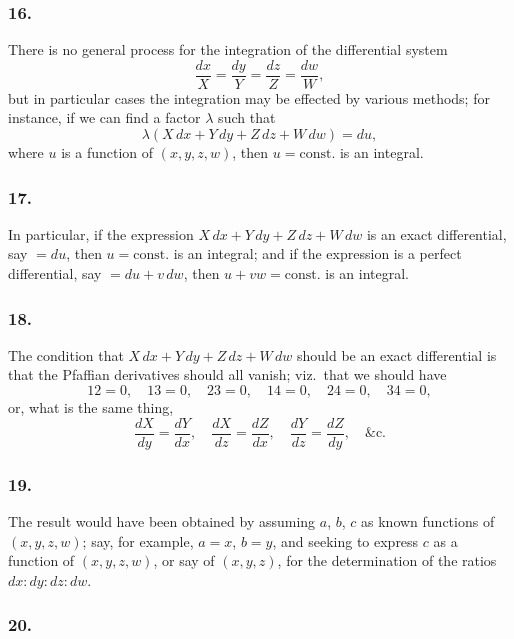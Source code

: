 \documentclass[12pt,a4paper]{article}
\theoremstyle{plain}
\begin{document}
\newpage
\setcounter{page}{121}

\subsubsection*{16.}

There is no general process for the integration of the differential system
\[
\frac{dx}{X} = \frac{dy}{Y} = \frac{dz}{Z} = \frac{dw}{W},
\]
but in particular cases the integration may be effected by various methods; for instance, if we can find a factor $\lambda$ such that
\[
\lambda(X\,dx + Y\,dy + Z\,dz + W\,dw) = du,
\]
where $u$ is a function of $(x, y, z, w)$, then $u = \text{const.}$ is an integral.

\subsubsection*{17.}

In particular, if the expression $X\,dx + Y\,dy + Z\,dz + W\,dw$ is an exact differential, say $= du$, then $u = \text{const.}$ is an integral; and if the expression is a perfect differential, say $= du + v\,dw$, then $u + vw = \text{const.}$ is an integral.

\subsubsection*{18.}

The condition that $X\,dx + Y\,dy + Z\,dz + W\,dw$ should be an exact differential is that the Pfaffian derivatives should all vanish; viz.~that we should have
\[
12 = 0, \quad 13 = 0, \quad 23 = 0, \quad 14 = 0, \quad 24 = 0, \quad 34 = 0,
\]
or, what is the same thing,
\[
\frac{dX}{dy} = \frac{dY}{dx}, \quad \frac{dX}{dz} = \frac{dZ}{dx}, \quad \frac{dY}{dz} = \frac{dZ}{dy}, \quad \&\text{c.}
\]

\subsubsection*{19.}

The result would have been obtained by assuming $a$, $b$, $c$ as known functions of $(x, y, z, w)$; say, for example, $a = x$, $b = y$, and seeking to express $c$ as a function of $(x, y, z, w)$, or say of $(x, y, z)$, for the determination of the ratios $dx : dy : dz : dw$.

\subsubsection*{20.}
\end{document}
